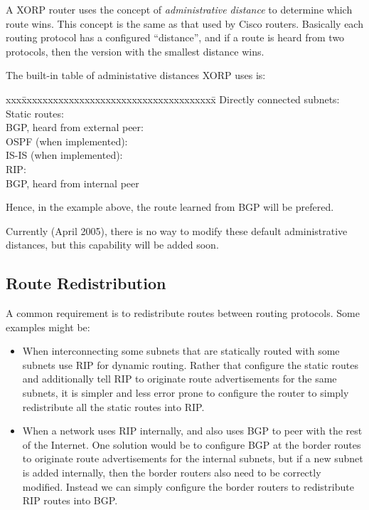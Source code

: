 A XORP router uses the concept of {\it administrative distance} to
determine which route wins.  This concept is the same as that used by
Cisco routers.  Basically each routing protocol has a configured
``distance'', and if a route is heard from two protocols, then the
version with the smallest distance wins.

The built-in table of administative distances XORP uses is:
\begin{tabbing}
xxx\=xxxxxxxxxxxxxxxxxxxxxxxxxxxxxxxxxxxxx\=\kill
\>Directly connected subnets: \\
\>Static routes:\\
\>BGP, heard from external peer:\\
\>OSPF (when implemented):\\
\>IS-IS (when implemented):\\
\>RIP:\\
\>BGP, heard from internal peer\\
\end{tabbing}
Hence, in the example above, the route learned from BGP will be prefered.

Currently (April 2005), there is no way to modify these default
administrative distances, but this capability will be added soon.

\subsection{Route Redistribution}

A common requirement is to redistribute routes between routing
protocols.  Some examples might be:

\begin{itemize}
\item When interconnecting some subnets that are statically routed
  with some subnets use RIP for dynamic routing.  Rather
  that configure the static routes and additionally tell RIP to
  originate route advertisements for the same subnets, it is simpler
  and less error prone to configure the router to simply redistribute
  all the static routes into RIP.
\item When a network uses RIP internally, and also uses BGP to
  peer with the rest of the Internet.  One solution would be to
  configure BGP at the border routes to originate route advertisements
  for the internal subnets, but if a new subnet is added internally,
  then the border routers also need to be correctly modified.  Instead
  we can simply configure the border routers to redistribute RIP
  routes into BGP.  
\end{itemize}

